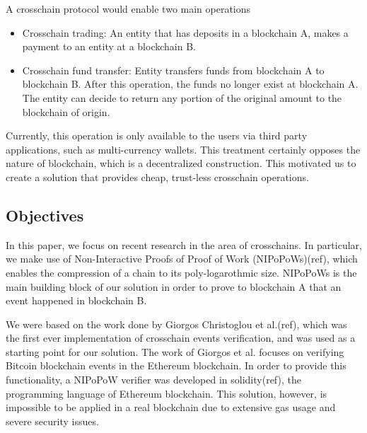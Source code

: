 \documentclass{article}
\begin{document}
  A crosschain protocol would enable two main operations
  \begin{itemize}
  \item
    Crosschain trading: An entity that has deposits in a blockchain A,
    makes a payment to an entity at a blockchain B.
  \item
    Crosschain fund transfer: Entity transfers funds from blockchain A
    to blockchain B. After this operation, the funds no longer exist at
    blockchain A. The entity can decide to return any portion of the
    original amount to the blockchain of origin.
  \end{itemize}

  Currently, this operation is only available to the users via third
  party applications, such as multi-currency wallets. This treatment
  certainly opposes the nature of blockchain, which is a decentralized
  construction. This motivated us to create a solution that provides
  cheap, trust-less crosschain operations.

  \subsection{Objectives}

  In this paper, we focus on recent research in the area of crosschains.
  In particular, we make use of Non-Interactive Proofs of Proof of Work
  (NIPoPoWs)(ref), which enables the compression of a chain to its
  poly-logarothmic size. NIPoPoWs is the main building block of our
  solution in order to prove to blockchain A that an event happened in
  blockchain B.

  We were based on the work done by Giorgos Christoglou et al.(ref),
  which was the first ever implementation of crosschain events
  verification, and was used as a starting point for our solution. The
  work of Giorgos et al. focuses on verifying Bitcoin blockchain events
  in the Ethereum blockchain. In order to provide this functionality, a
  NIPoPoW verifier was developed in solidity(ref), the programming
  language of Ethereum blockchain. This solution, however, is impossible
  to be applied in a real blockchain due to extensive gas usage and
  severe security issues.
\end{document}
